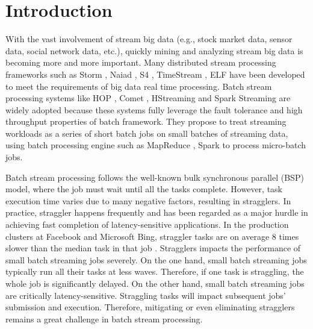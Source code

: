 \documentclass[10pt,conference,compsocconf,letterpaper]{IEEEtran}
\begin{document}
\section{Introduction}

  With the vast involvement of stream big data (e.g., stock market data, sensor data, social network data, etc.), quickly mining and analyzing stream big data is becoming more and more important. Many distributed stream processing frameworks such as Storm \cite{storm-web}, Naiad \cite{Murray2013}, S4 \cite{Neumeyer2010}, TimeStream \cite{Qian2013}, ELF \cite{Hu2014} have been developed to meet the requirements of big data real time processing. Batch stream processing systems like HOP \cite{Condie2010}, Comet \cite{He2010}, HStreaming \cite{HStreaming} and Spark Streaming \cite{Zaharia2013} are widely adopted because these systems fully leverage the fault tolerance and high throughput properties of batch framework\cite{spark-summit}. They propose to treat streaming workloads as a series of short batch jobs on small batches of streaming data, using batch processing engine such as MapReduce \cite{Dean2004}, Spark \cite{Zaharia2010C} to process micro-batch jobs.

  Batch stream processing follows the well-known bulk synchronous parallel (BSP) model, where the job must wait until all the tasks complete. However, task execution time varies due to many negative factors, resulting in stragglers. In practice, straggler happens frequently and has been regarded as a major hurdle in achieving fast completion of latency-sensitive applications. In the production clusters at Facebook and Microsoft Bing, straggler tasks are on average 8 times slower than the median task in that job \cite{Ananthanarayanan2013} \cite{Yadwadkar2014}. Stragglers impacts the performance of small batch streaming jobs severely. On the one hand, small batch streaming jobs typically run all their tasks at less waves. Therefore, if one task is straggling, the whole job is significantly delayed. On the other hand, small batch streaming jobs are critically latency-sensitive. Straggling tasks will impact subsequent jobs' submission and execution. Therefore, mitigating or even eliminating stragglers remains a great challenge in batch stream processing.
\end{document}
